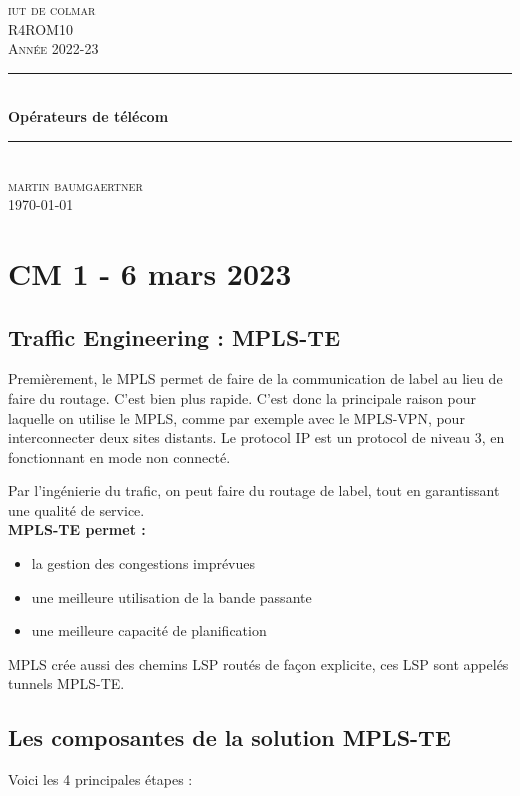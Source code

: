 \documentclass[12pt, a4paper]{article}
\begin{document}
\begin{titlepage}
	\newcommand{\HRule}{\rule{\linewidth}{0.5mm}} 
	\center 
	\textsc{\LARGE iut de colmar}\\[6.5cm] 
	\textsc{\Large R4ROM10}\\[0.5cm] 
	\textsc{\large Année 2022-23}\\[0.5cm]
	\HRule\\[0.75cm]
	{\huge\bfseries Opérateurs de télécom}\\[0.4cm]
	\HRule\\[1.5cm]
	\textsc{\large martin baumgaertner}\\[6.5cm] 

	\vfill\vfill\vfill
	{\large\today} 
	\vfill
\end{titlepage}
\newpage
\tableofcontents
\newpage
\section{CM 1 - 6 mars 2023}
\subsection{Traffic Engineering : MPLS-TE}
Premièrement, le MPLS permet de faire de la communication de label au lieu
de faire du routage. C'est bien plus rapide. C'est donc la principale raison 
pour laquelle on utilise le MPLS, comme par exemple avec le MPLS-VPN, 
pour interconnecter deux sites distants. 
Le protocol IP est un protocol de niveau 3, en fonctionnant en mode non 
connecté. 

Par l'ingénierie du trafic, on peut faire du routage de label, tout en garantissant
une qualité de service. \\

\textbf{MPLS-TE permet :}\\
\begin{itemize}
    \item la gestion des congestions imprévues
    \item une meilleure utilisation de la bande passante
    \item une meilleure capacité de planification\\
\end{itemize}

MPLS crée aussi des chemins LSP routés de façon explicite, ces LSP sont appelés
tunnels MPLS-TE. 

\subsection{Les composantes de la solution MPLS-TE}
Voici les 4 principales étapes : \\
\end{document}
